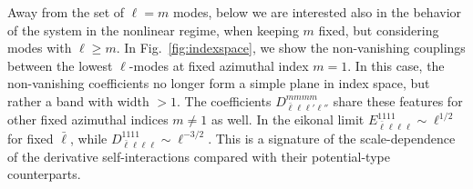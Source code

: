 \documentclass[aps,prl,notitlepage,superscriptaddress,twocolumn]{revtex4-1}
\begin{document}
Away from the set of $\ell=m$ modes, below we are interested also in the behavior of the system in the nonlinear regime, when keeping $m$ fixed, but considering modes with $\ell\geq m$. In Fig.~\ref{fig:indexspace}, we show the non-vanishing couplings between the lowest $\ell$-modes at fixed azimuthal index $m=1$. In this case, the non-vanishing coefficients no longer form a simple plane in index space, but rather a band with width $>1$. The coefficients $D^{mmmm}_{\bar{\ell}\ell\ell'\ell''}$ share these features for other fixed azimuthal indices $m\neq 1$ as well. In the eikonal limit $E^{1111}_{\bar{\ell}\ell\ell\ell}\sim \ell^{1/2}$ for fixed $\bar{\ell}$, while $D^{1111}_{\bar{\ell}\ell\ell\ell}\sim \ell^{-3/2}$. This is a signature of the scale-dependence of the derivative self-interactions compared with their potential-type counterparts.
\end{document}
